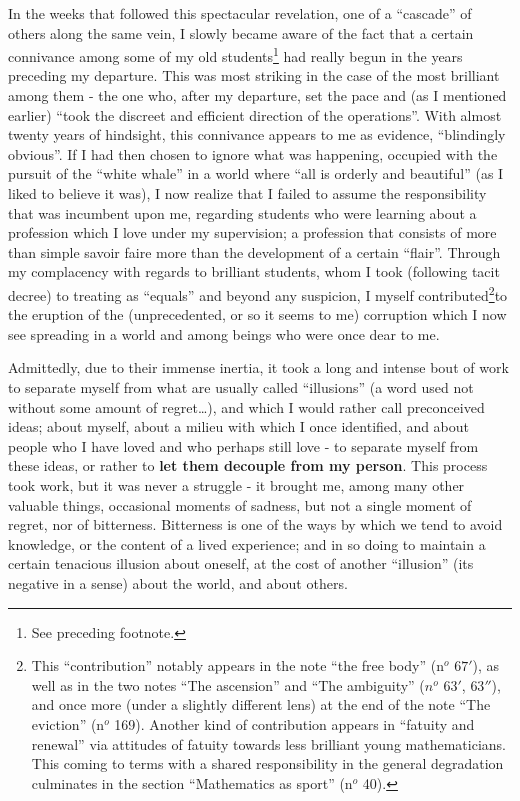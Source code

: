 In the weeks that followed this spectacular revelation, 
one of a ``cascade'' of others along the same vein, I slowly became aware of the fact that
a certain connivance among some of my old students\footnote{See preceding footnote.}
had really begun in the years preceding my departure. This was most striking in the case
of the most brilliant among them - the one who, after my departure, set the pace and (as I
mentioned earlier) ``took the discreet and efficient direction of the operations''.
With almost twenty years of hindsight, this connivance appears to me as evidence,
``blindingly obvious''. If I had then chosen to ignore what was happening, 
occupied with the pursuit of the ``white whale'' in a world where ``all is orderly and
beautiful'' (as I liked to believe it was), I now realize that I failed to assume the
responsibility that was incumbent upon me, regarding students who were learning about a
profession which I love under my supervision; a profession that consists of more than
simple savoir faire more than the development of a certain ``flair''. 
Through my complacency with regards to brilliant students, whom I took (following tacit
decree) to treating as ``equals'' and beyond any suspicion, I myself contributed\footnote{
This ``contribution'' notably appears in the note ``the free body''
(n$^o$ $67'$), as well as in the two notes ``The ascension'' and ``The ambiguity'' ($n^o$
$63'$, $63''$), and once more (under a slightly different lens) at the end of the note
``The eviction'' (n$^o$ 169). Another kind of contribution appears in 
``fatuity and renewal'' via attitudes of fatuity towards less brilliant young
mathematicians. This coming to terms with a shared responsibility in the general
degradation culminates in the section ``Mathematics as sport'' (n$^o$ 40).}to the
eruption of the (unprecedented, or so it seems to me) corruption 
which I now see spreading in a world and among beings who were once dear to me.

Admittedly, due to their immense inertia, it took a long and intense bout of work to
separate myself from what are usually called ``illusions'' (a word used not without some
amount of regret\ldots), and which I would rather call preconceived ideas; about myself,  
about a milieu with which I once identified, and about people who I have loved and who
perhaps still love - to separate myself from these ideas, or rather to \textbf{let them
decouple from my person}.
This process took work, but it was never a struggle - it brought me, among many other
valuable things, occasional moments of sadness, but not a single moment of regret, nor of
bitterness. 
Bitterness is one of the ways by which we tend to avoid 
knowledge, or the 
content of a lived experience; and in so doing to maintain a certain tenacious illusion
about oneself, at the cost of another ``illusion'' (its negative in a sense)
about the world, and about others.

